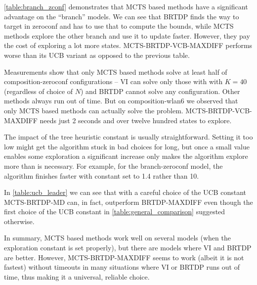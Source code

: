 \autoref{table:branch_zconf} demonstrates that MCTS based methods have a
significant advantage on the ``branch'' models. We can see that BRTDP finds the
way to target in zeroconf and has to use that to compute the bounds, while MCTS
methods explore the other branch and use it to update faster. However, they pay
the cost of exploring a lot more states. MCTS-BRTDP-VCB-MAXDIFF performs worse
than its UCB variant as opposed to the previous table.

Measurements show that only MCTS based methods solve at least half of
composition-zeroconf configurations -- VI can solve only those with with
$K = 40$ (regardless of choice of $N$) and BRTDP cannot solve any configuration.
Other methods always run out of time.
But on composition-wlan6 we observed that only MCTS based methods
can actually solve the problem. MCTS-BRTDP-VCB-MAXDIFF needs just 2 seconds and
over twelve hundred states to explore.

The impact of the tree heuristic constant is usually straightforward. Setting it
too low might get the algorithm stuck in bad choices for long, but once a small
value enables some exploration a significant increase only makes the algorithm
explore more than is necessary. For example, for the branch-zeroconf model, the
algorithm finishes faster with constant set to 1.4 rather than 10.

In \autoref{table:ucb_leader} we can see that with a careful choice of the UCB constant
MCTS-BRTDP-MD can, in fact, outperform BRTDP-MAXDIFF even though the first choice
of the UCB constant in \autoref{table:general_comparison} suggested otherwise.

In summary, MCTS based methods work well on several models (when the
exploration constant is set properly), but there are models where VI and
BRTDP are better.  However, MCTS-BRTDP-MAXDIFF seems to work (albeit it
is not fastest) without timeouts in many situations where VI or BRTDP
runs out of time, thus making it a universal, reliable choice.

